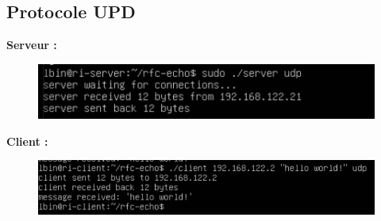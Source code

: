 \documentclass{article}
\begin{document}
    \subsection*{Protocole UPD}
    \textbf{Serveur :}
    \begin{figure}[H]
        \centering
        \includegraphics[width=.65\linewidth]{./screenshots/echo-server-udp.png}
    \end{figure}

    \textbf{Client :}
    \begin{figure}[H]
        \centering
        \includegraphics[width=.65\linewidth]{./screenshots/echo-client-udp.png}
    \end{figure}
\end{document}
